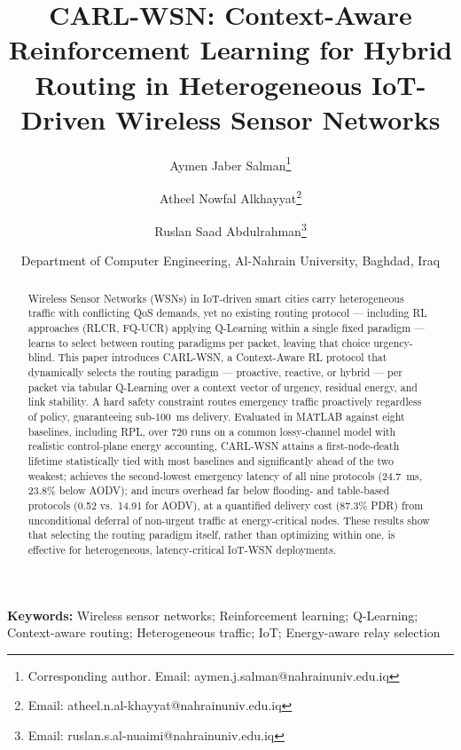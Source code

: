 \documentclass[12pt]{article}
\begin{document}
\title{CARL-WSN: Context-Aware Reinforcement Learning for Hybrid Routing in Heterogeneous IoT-Driven Wireless Sensor Networks}

\author{
Aymen Jaber Salman\thanks{Corresponding author. Email: aymen.j.salman@nahrainuniv.edu.iq} \and
Atheel Nowfal Alkhayyat\thanks{Email: atheel.n.al-khayyat@nahrainuniv.edu.iq} \and
Ruslan Saad Abdulrahman\thanks{Email: ruslan.s.al-nuaimi@nahrainuniv.edu.iq}
}
\date{Department of Computer Engineering, Al-Nahrain University, Baghdad, Iraq}

\maketitle

\begin{abstract}
Wireless Sensor Networks (WSNs) in IoT-driven smart cities carry heterogeneous
traffic with conflicting QoS demands, yet no existing routing
protocol — including RL approaches (RLCR, FQ-UCR) applying Q-Learning
within a single fixed paradigm — learns to select between routing
paradigms per packet, leaving that choice urgency-blind. This paper
introduces CARL-WSN, a Context-Aware RL protocol that dynamically
selects the routing paradigm — proactive, reactive, or hybrid — per
packet via tabular Q-Learning over a context vector of urgency,
residual energy, and link stability. A hard safety constraint routes
emergency traffic proactively regardless of policy, guaranteeing
sub-100~ms delivery. Evaluated in MATLAB against eight baselines,
including RPL, over 720 runs on a common lossy-channel model with
realistic control-plane energy accounting, CARL-WSN attains a
first-node-death lifetime statistically tied with most baselines and
significantly ahead of the two weakest; achieves the second-lowest
emergency latency of all nine protocols (24.7~ms, 23.8\% below AODV);
and incurs overhead far below flooding- and table-based protocols
(0.52 vs.\ 14.91 for AODV), at a quantified delivery cost (87.3\% PDR)
from unconditional deferral of non-urgent traffic at energy-critical
nodes. These results show that selecting the routing paradigm itself,
rather than optimizing within one, is effective for heterogeneous,
latency-critical IoT-WSN deployments.
\end{abstract}

\vspace{0.5em}
\noindent\textbf{Keywords:} Wireless sensor networks; Reinforcement learning; Q-Learning; Context-aware routing; Heterogeneous traffic; IoT; Energy-aware relay selection
\vspace{1em}
\end{document}
